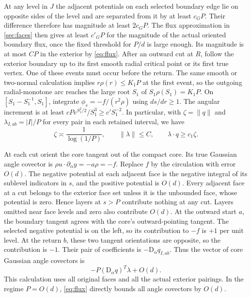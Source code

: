 At any level in \(J\) the adjacent potentials on each selected boundary edge lie on opposite sides of the level and are separated from it by at least \(c_G P\). Their difference therefore has magnitude at least \(2c_GP\). The flux approximation in \cref{sec:faces} then gives at least \(c'_GP\) for the magnitude of the actual oriented boundary flux, once the fixed threshold for \(P/d\) is large enough. Its magnitude is at most \(CP\) in the exterior by \eqref{eq:flux}. After an outward cut at \(R\), follow the exterior boundary up to its first smooth radial critical point or its first true vertex. One of these events must occur before the return. The same smooth or two-normal calculation implies \(r\rho(r)\le K_1P\) at the first event, so the outgoing radial-monotone arc reaches the large root \(S_1\) of \(S_1\rho(S_1)=K_1P\). On \([S_1-S_1^{-1},S_1]\), integrate \(\phi_s=-f/(r^2\rho)\) using \(ds/dr\ge1\). The angular increment is at least \(c P e^{S_1^2/2}/S_1^3\ge c' S_1^{-2}\). In particular, with \(\zeta=\|q\|\) and \(\lambda_{I,ab}=|I|/P\) for every pair in each retained interval, we have \begin{equation}\label{eq:pairings}
 \zeta\asymp\frac1{\log(1/P)},\qquad
 \|\lambda\|\le C,\qquad \lambda\cdot q\ge c_1\zeta .
\end{equation}

At each cut orient the core tangent out of the compact core. Its true Gaussian angle covector is \(\rho u\cdot\partial_\alpha y=-a\rho=-f\). Replace \(f\) by the circulation with error \(O(d)\). The negative potential at each adjacent face is the negative integral of its sublevel indicators in \(s\), and the positive potential is \(O(d)\). Every adjacent face at a cut belongs to the exterior face set unless it is the unbounded face, whose potential is zero. Hence layers at \(s>P\) contribute nothing at any cut. Layers omitted near face levels and zero also contribute \(O(d)\). At the outward start \(a\), the boundary tangent agrees with the core's outward-pointing tangent. The selected negative potential is on the left, so its contribution to \(-f\) is \(+1\) per unit level. At the return \(b\), these two tangent orientations are opposite, so the contribution is \(-1\). Their pair of coefficients is \(-\mathrm D_\alpha q_{I,ab}\). Thus the vector of core Gaussian angle covectors is \begin{equation}\label{eq:force}
       -P(\mathrm D_\alpha q)^T\lambda+O(d).
\end{equation} This calculation uses all original faces and all the actual exterior pairings. In the regime \(P=O(d)\), \eqref{eq:flux} directly bounds all angle covectors by \(O(d)\).

